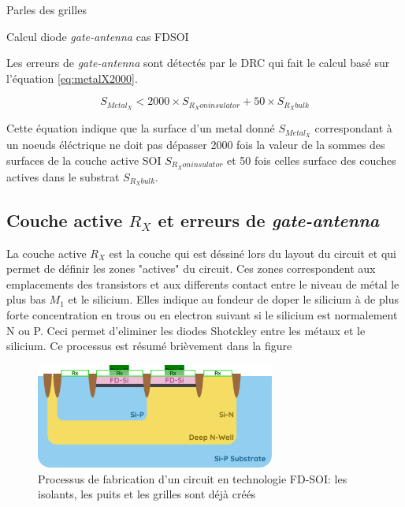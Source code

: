 \begin{metsUneSource}
Parles des grilles

Calcul diode \textit{gate-antenna} cas FDSOI
\end{metsUneSource}

Les erreurs de \textit{gate-antenna} sont détectés par le DRC qui fait le calcul basé sur l'équation \ref*{eq:metalX2000}.

\begin{equation}
  S_{Metal_{X}} <2000 \times S_{R_{X} on insulator}+50 \times S_{R_X bulk}
  \label{eq:metalX2000}
\end{equation}

Cette équation indique que la surface d'un metal donné  $S_{Metal_{X}}$ correspondant à un noeuds éléctrique ne doit pas dépasser 2000 fois la valeur de la sommes des surfaces de la couche active SOI $S_{R_{X} on insulator}$ et 50 fois celles surface des couches actives dans le substrat $S_{R_X bulk}$.

\subsection{Couche active $R_{X}$ et erreurs de \textit{gate-antenna}}
La couche active $R_{X}$ est la couche qui est déssiné lors du layout du circuit et qui permet de définir les zones "actives" du circuit. Ces zones correspondent aux emplacements des transistors et aux differents contact entre le niveau de métal le plus bas $M_1$ et le silicium. Elles indique au fondeur de doper le silicium à de plus forte concentration en trous ou en electron suivant si le silicium est normalement N ou P. Ceci permet d'eliminer les diodes Shotckley entre les métaux et le silicium. Ce processus est résumé brièvement dans la figure %

\begin{figure}[H]
  \centering
  \includegraphics[width=0.7\textwidth]{figures/FabSOI-MiddleEND-2.pdf}
  \caption{Processus de fabrication d'un circuit en technologie FD-SOI: les isolants, les puits et les grilles sont déjà créés}
  \label{fig:process fdsoi 2}
\end{figure}

